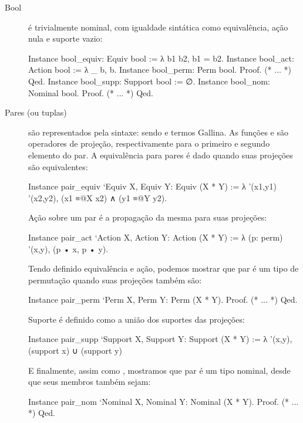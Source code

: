 \begin{description}
	\item [Bool] é trivialmente nominal, com igualdade sintática como equivalência, ação nula e suporte vazio:
	\begin{coqcode}
Instance bool_equiv: Equiv bool := λ b1 b2, b1 = b2.
Instance bool_act: Action bool := λ _ b, b.
Instance bool_perm: Perm bool. Proof. (* ... *) Qed.
Instance bool_supp: Support bool := ∅.
Instance bool_nom: Nominal bool. Proof. (* ... *) Qed.
	\end{coqcode}
	
	\item[Pares (ou tuplas)] são representados pela sintaxe:  sendo  e  termos Gallina. As funções  e  são operadores de projeção, respectivamente para o primeiro e segundo elemento do par. A equivalência para pares é dado quando suas projeções são equivalentes:
	\begin{coqcode}
Instance pair_equiv `{Equiv X, Equiv Y}: Equiv (X * Y) :=
   λ '(x1,y1) '(x2,y2), (x1 ≡@{X} x2) ∧ (y1 ≡@{Y} y2).
	\end{coqcode}
	Ação sobre um par é a propagação da mesma para suas projeções:
	\begin{coqcode}
Instance pair_act `{Action X, Action Y}: Action (X * Y) :=
   λ (p: perm) '(x,y), (p • x, p • y).
	\end{coqcode}
	Tendo definido equivalência e ação, podemos mostrar que par é um tipo de permutação quando suas projeções também são:
	\begin{coqcode}
Instance pair_perm `{Perm X, Perm Y}: Perm (X * Y).
Proof. (* ... *) Qed.
	\end{coqcode}
	Suporte é definido como a união dos suportes das projeções:
	\begin{coqcode}
Instance pair_supp `{Support X, Support Y}: Support (X * Y) :=
   λ '(x,y), (support x) ∪ (support y)
	\end{coqcode}
	E finalmente, assim como , mostramos que par é um tipo nominal, desde que seus membros também sejam:
	\begin{coqcode}
Instance pair_nom `{Nominal X, Nominal Y}: Nominal (X * Y).
Proof. (* ... *) Qed.	
	\end{coqcode}


\end{description}
